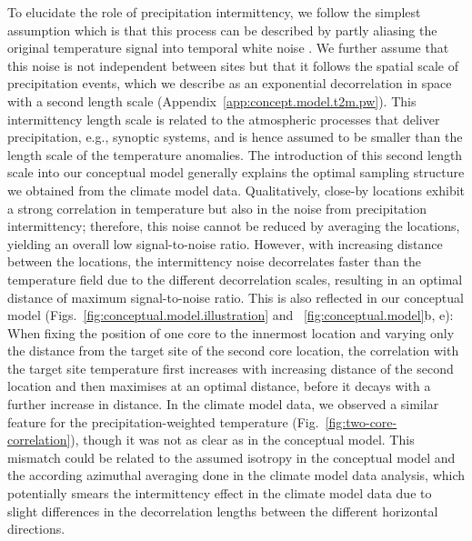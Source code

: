 \documentclass[cp, manuscript]{copernicus}
\begin{document}
To elucidate the role of precipitation intermittency, we follow the simplest
assumption which is that this process can be described by partly aliasing the
original temperature signal into temporal white noise
\citep{Laepple2018,Casado2020}. We further assume that this noise is not
independent between sites but that it follows the spatial scale of precipitation
events, which we describe as an exponential decorrelation in space with a second
length scale (Appendix~\ref{app:concept.model.t2m.pw}). This intermittency
length scale is related to the atmospheric processes that deliver precipitation,
e.g., synoptic systems, and is hence assumed to be smaller than the length scale
of the temperature anomalies. The introduction of this second length scale into
our conceptual model generally explains the optimal sampling structure we
obtained from the climate model data. Qualitatively, close-by locations exhibit
a strong correlation in temperature but also in the noise from precipitation
intermittency; therefore, this noise cannot be reduced by averaging the
locations, yielding an overall low signal-to-noise ratio. However, with
increasing distance between the locations, the intermittency noise decorrelates
faster than the temperature field due to the different decorrelation scales,
resulting in an optimal distance of maximum signal-to-noise ratio. This is also
reflected in our conceptual model (Figs.~\ref{fig:conceptual.model.illustration}
and ~\ref{fig:conceptual.model}b, e): When fixing the position of one core to
the innermost location and varying only the distance from the target site of the
second core location, the correlation with the target site temperature first
increases with increasing distance of the second location and then maximises at
an optimal distance, before it decays with a further increase in distance. In
the climate model data, we observed a similar feature for the
precipitation-weighted temperature (Fig.~\ref{fig:two-core-correlation}), though
it was not as clear as in the conceptual model. This mismatch could be related
to the assumed isotropy in the conceptual model and the according azimuthal
averaging done in the climate model data analysis, which potentially smears the
intermittency effect in the climate model data due to slight differences in the
decorrelation lengths between the different horizontal directions.
\end{document}
